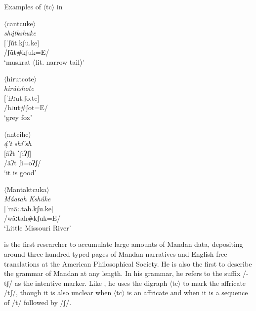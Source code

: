 \begin{exe}

\item\label{ExWillSpindenTC} Examples of $\langle$tc$\rangle$ in \citet{will1906}

\begin{xlist}
\item $\langle$cantcuke$\rangle$\\
    \textit{shų́tkshuke}\\
    {[}ˈʃũt.kʃu.ke]\\
    /ʃũt\#kʃuk=E/\\
    `muskrat (lit. narrow tail)'

\item $\langle$hirutcote$\rangle$\\
        \textit{hirútshote}\\
	{[}ˈhⁱɾut.ʃo.te]\\
	/hɾut\#ʃot=E/\\
	`grey fox'

\item $\langle$antcihc$\rangle$\\
        \textit{ą́'t shí'sh}\\
	{[}ãʔt ˈʃiʔʃ]\\
	/ãʔt ʃi=oʔʃ/\\
	`it is good'

\item $\langle$Mantaktcuka$\rangle$\\
        \textit{Máatah Kshúke}\\
	{[}ˈmãː.tah.kʃu.ke]\\
	/wãːtah\#kʃuk=E/\\
	`Little Missouri River'

\end{xlist}

\end{exe}

\citet{kennard1936} is the first researcher to accumulate large amounts of Mandan data, depositing around three hundred typed pages of Mandan narratives and English free translations at the American Philosophical Society. He is also the first to describe the grammar of Mandan at any length. In his grammar, he refers to the suffix /-tʃ/ as the intentive marker. Like \citet{will1906}, he uses the digraph $\langle$tc$\rangle$ to mark the affricate /tʃ/, though it is also unclear when $\langle$tc$\rangle$ is an affricate and when it is a sequence of /t/ followed by /ʃ/.

